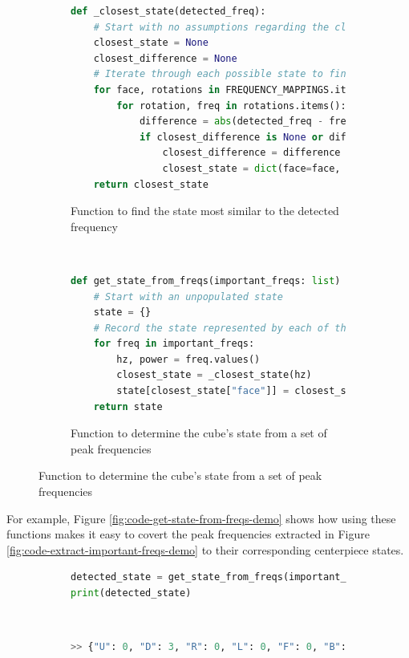 \begin{figure}[h]
\caption{Converting peak frequencies to centerpiece states}
\label{fig:code-convert-peak-freqs-to-state}
\begin{subfigure}{\textwidth}
\caption{Function to find the state most similar to the detected frequency}
\label{fig:code-closest-state}
\begin{lstlisting}[language=Python]
def _closest_state(detected_freq):
    # Start with no assumptions regarding the closest state
    closest_state = None
    closest_difference = None
    # Iterate through each possible state to find the closest one
    for face, rotations in FREQUENCY_MAPPINGS.items():
        for rotation, freq in rotations.items():
            difference = abs(detected_freq - freq)
            if closest_difference is None or difference < closest_difference:
                closest_difference = difference
                closest_state = dict(face=face, rotation=rotation)
    return closest_state
\end{lstlisting}
\end{subfigure}\\

\begin{subfigure}{\textwidth}
\caption{Function to determine the cube's state from a set of peak frequencies}
\label{fig:code-get-state-from-freqs} 
\begin{lstlisting}[language=Python, firstnumber=last]
def get_state_from_freqs(important_freqs: list) -> dict:
    # Start with an unpopulated state
    state = {}
    # Record the state represented by each of the peak frequencies
    for freq in important_freqs:
        hz, power = freq.values()
        closest_state = _closest_state(hz)
        state[closest_state["face"]] = closest_state["rotation"]
    return state
\end{lstlisting}
\end{subfigure}
\end{figure}

For example, Figure \ref{fig:code-get-state-from-freqs-demo} shows how using these functions makes it easy to covert the peak frequencies extracted in Figure \ref{fig:code-extract-important-freqs-demo} to their corresponding centerpiece states.

\begin{figure}[h]
\caption{Example conversion of peak frequencies to states}
\label{fig:code-get-state-from-freqs-demo} 
\begin{subfigure}{\textwidth}
\begin{lstlisting}[language=Python]
detected_state = get_state_from_freqs(important_freqs)
print(detected_state)
\end{lstlisting}
\end{subfigure}\\

\begin{subfigure}{\textwidth}
\begin{lstlisting}[language=Python, numbers=none]
>> {"U": 0, "D": 3, "R": 0, "L": 0, "F": 0, "B": 0}
\end{lstlisting}
\end{subfigure}
\end{figure}

